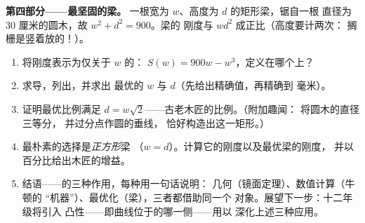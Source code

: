 \begin{problem}
\medskip
\noindent\textbf{第四部分——最坚固的梁。}
一根宽为 $w$、高度为 $d$ 的矩形梁，锯自一根
直径为 $30$ 厘米的圆木，故 $w^2 + d^2 = 900$。梁的
刚度与 $w d^2$ 成正比（高度要计两次：
搁栅是竖着放的！）。
\begin{enumerate}[resume]
  \item 将刚度表示为仅关于 $w$ 的：
        $S(w) = 900w - w^3$，定义在哪个上？
  \item 求导，列出，并求出
        最优的 $w$ 与 $d$（先给出精确值，再精确到
        毫米）。
  \item 证明最优比例满足
        $d = w\sqrt2$——古老木匠的比例。（附加趣闻：
        将圆木的直径三等分，
        并过分点作圆的垂线，
        恰好构造出这一矩形。）
  \item 最朴素的选择是\emph{正方形}梁
        （$w = d$）。计算它的刚度以及最优梁的刚度，
        并以百分比给出木匠的增益。
  \item 结语——的三种作用，每种用一句话说明：
        几何（镜面定理）、数值计算（牛顿的
        “机器”）、最优化（梁），三者都借助同一个
        对象。展望下一步：十二年级将引入
        凸性——即曲线位于的哪一侧——用以
        深化上述三种应用。
\end{enumerate}
\end{problem}
